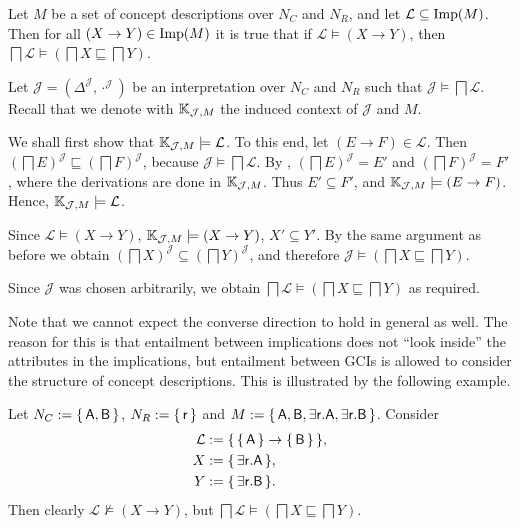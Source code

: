 \begin{Lemma}
  \label{lem:implicational-entailment-implies-gci-entailment}
  Let $M$ be a set of concept descriptions over $N_C$ and $N_R$, and let $\mathcal{L}
  \subseteq \operatorname{Imp}(M)$.  Then for all $(X \to Y) \in \operatorname{Imp}(M)$ it is true that if
  $\mathcal{L} \models (X \to Y)$, then $\bigsqcap \mathcal{L} \models (\bigsqcap X
  \sqsubseteq \bigsqcap Y)$.
\end{Lemma}
\begin{Proof}
  Let $\mathcal{J} = (\Delta^{\mathcal{J}}, \cdot^{\mathcal{J}})$ be an interpretation
  over $N_C$ and $N_R$ such that $\mathcal{J} \models \bigsqcap \mathcal{L}$.  Recall that
  we denote with ${\mathbb{K}}_{\mathcal{J}, M}$ the induced context of $\mathcal{J}$ and $M$.
  
  We shall first show that ${\mathbb{K}}_{\mathcal{J}, M} \models \mathcal{L}$.  To this end,
  let $(E \to F) \in \mathcal{L}$.  Then $(\bigsqcap E)^{\mathcal{J}} \sqsubseteq
  (\bigsqcap F)^{\mathcal{J}}$, because $\mathcal{J} \models \bigsqcap \mathcal{L}$.  By
  , $(\bigsqcap E)^{\mathcal{J}} = E'$ and $(\bigsqcap
  F)^{\mathcal{J}} = F'$, where the derivations are done in ${\mathbb{K}}_{\mathcal{J}, M}$.
  Thus $E' \subseteq F'$, and ${\mathbb{K}}_{\mathcal{J}, M} \models (E \to F)$.  Hence, ${\mathbb{K}}_{\mathcal{J}, M} \models \mathcal{L}$.

  Since $\mathcal{L} \models (X \to Y)$, ${\mathbb{K}}_{\mathcal{J}, M} \models (X \to Y)$, \ie
  $X' \subseteq Y'$.  By the same argument as before we obtain $(\bigsqcap
  X)^{\mathcal{J}} \subseteq (\bigsqcap Y)^{\mathcal{J}}$, and therefore $\mathcal{J}
  \models (\bigsqcap X \sqsubseteq \bigsqcap Y)$.

  Since $\mathcal{J}$ was chosen arbitrarily, we obtain $\bigsqcap \mathcal{L} \models
  (\bigsqcap X \sqsubseteq \bigsqcap Y)$ as required.
\end{Proof}

Note that we cannot expect the converse direction to hold in general as well.  The reason
for this is that entailment between implications does not \enquote{look inside} the
attributes in the implications, but entailment between GCIs is allowed to consider the
structure of concept descriptions.  This is illustrated by the following example.

\begin{Example}
  \label{expl:gci-entailment-does-not-impliy-implicational-entailment}
  Let $N_C := {\{\, \mathsf{A}, \mathsf{B} \,\}}$, $N_R := {\{\, \mathsf{r} \,\}}$ and $M := {\{\,
    \mathsf{A}, \mathsf{B}, \mathsf{\exists r. A}, \mathsf{\exists r. B} \,\}}$.  Consider
  \begin{align*}
    \mathcal{L} &:= {\{\, {\{\, \mathsf{A} \,\}} \to {\ensuremath{\{\, \mathsf{B} \,\}}} \,\}}, \\
    X &:= {\{\, \mathsf{\exists r. A} \,\}}, \\
    Y &:= {\{\, \mathsf{\exists r. B} \,\}}.
  \end{align*}
  Then clearly $\mathcal{L} \not\models (X \to Y)$, but $\bigsqcap \mathcal{L} \models
  (\bigsqcap X \sqsubseteq \bigsqcap Y)$.
\end{Example}

